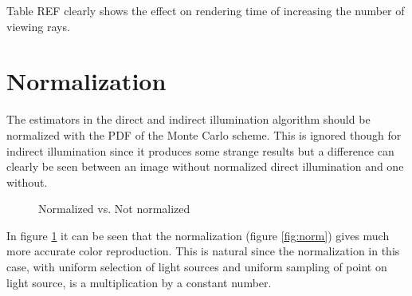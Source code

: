 \documentclass[a4paper]{report}
\begin{document}

Table REF clearly shows the effect on rendering time of increasing the number of viewing rays.

\section{Normalization}

The estimators in the direct and indirect illumination algorithm
should be normalized with the PDF of the Monte Carlo scheme. This is
ignored though for indirect illumination since it produces some
strange results but a difference can clearly be seen between an image
without normalized direct illumination and one without.

\begin{figure}
  \centering
  \caption{Normalized vs. Not normalized}
  \label{fig:normcomp}
\end{figure}

In figure \ref{fig:normcomp} it can be seen that the normalization
(figure \ref{fig:norm}) gives much more accurate color
reproduction. This is natural since the normalization in this case,
with uniform selection of light sources and uniform sampling of
point on light source, is a multiplication by a constant number.
\end{document}
